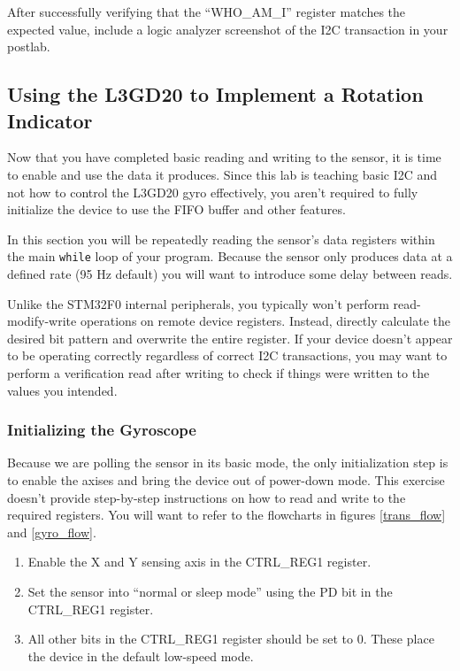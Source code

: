 \documentclass[openany,11pt,fleqn]{book} %
\begin{document}
After successfully verifying that the ``WHO\_AM\_I'' register matches the expected value, include a logic analyzer screenshot of the I2C transaction in your postlab.
 
\subsection{Using the L3GD20 to Implement a Rotation Indicator}
Now that you have completed basic reading and writing to the sensor, it is time to enable and use the data it produces. Since this lab is teaching basic I2C and not how to control the L3GD20 gyro effectively, you aren't required to fully initialize the device to use the FIFO buffer and other features.

In this section you will be repeatedly reading the sensor's data registers within the main \texttt{while} loop of your program. Because the sensor only produces data at a defined rate (95 Hz default) you will want to introduce some delay between reads.

Unlike the STM32F0 internal peripherals, you typically won't perform read-modify-write operations on remote device registers. Instead, directly calculate the desired bit pattern and overwrite the entire register. If your device doesn't appear to be operating correctly regardless of correct I2C transactions, you may want to perform a verification read after writing to check if things were written to the values you intended. 

\subsubsection{Initializing the Gyroscope}
Because we are polling the sensor in its basic mode, the only initialization step is to enable the axises and bring the device out of power-down mode. This exercise doesn't provide step-by-step instructions on how to read and write to the required registers. You will want to refer to the flowcharts in figures \ref{trans_flow} and \ref{gyro_flow}.

\begin{enumerate}
    \item Enable the X and Y sensing axis in the CTRL\_REG1 register.
    \item Set the sensor into ``normal or sleep mode'' using the PD bit in the CTRL\_REG1 register.
    \item All other bits in the CTRL\_REG1 register should be set to 0. These place the device in the default low-speed mode.
\end{enumerate} 
\end{document}
